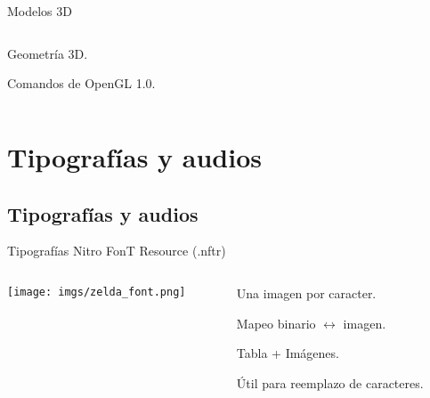\begin{frame}{Modelos 3D}
    \begin{columns}
    \begin{column}{0.5\textwidth}
        \begin{wideitemize}
            \item<1-> Geometría 3D.
            \item<2-> Comandos de OpenGL 1.0.
        \end{wideitemize}
    \end{column}
    \begin{column}{0.6\textwidth}
    \end{column}
    \end{columns}
\end{frame}

\section{Tipografías y audios}
\subsection{Tipografías y audios}
\begin{frame}{Tipografías}
    \centering{}Nitro FonT Resource (.nftr) \\ \vspace{5pt}
    \begin{columns}
    \begin{column}{0.5\textwidth}
        \texttt{[image: imgs/zelda\_font.png]}
    \end{column}
    \begin{column}{0.6\textwidth}
        \begin{wideitemize}
            \item<+-> Una imagen por caracter.
            \item<+-> Mapeo binario $\leftrightarrow$ imagen.
            \item<+-> Tabla + Imágenes.
            \item<+-> Útil para reemplazo de caracteres.
        \end{wideitemize}
    \end{column}
    \end{columns}
\end{frame}

